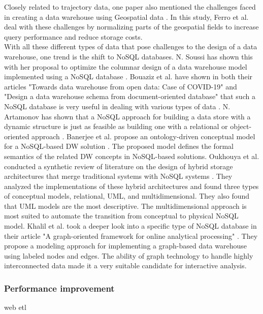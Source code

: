 \documentclass[11pt]{article}
\begin{document}
Closely related to trajectory data, one paper also mentioned the challenges faced in creating a data warehouse using Geospatial data \cite{Ferro2019221}. In this study, Ferro et al. deal with these challenges by normalizing parts of the geospatial fields to increase query performance and reduce storage costs.\\

With all these different types of data that pose challenges to the design of a data warehouse, one trend is the shift to NoSQL databases. N. Soussi has shown this with her proposal to optimize the columnar design of a data warehouse model implemented using a NoSQL database \cite{Soussi2023762}. Bouaziz et al. have shown in both their articles "Towards data warehouse from open data: Case of COVID-19" and "Design a data warehouse schema from document-oriented database" that such a NoSQL database is very useful in dealing with various types of data \cite{Bouaziz2019221, Bouaziz2021129}. N. Artamonov has shown that a NoSQL approach for building a data store with a dynamic structure is just as feasible as building one with a relational or object-oriented approach \cite{Artamonov2019794}. Banerjee et al. propose an ontology-driven conceptual model for a NoSQL-based DW solution \cite{Banerjee2021162}. The proposed model defines the formal semantics of the related DW concepts in NoSQL-based solutions. Oukhouya et al. conducted a synthetic review of literature on the design of hybrid storage architectures that merge traditional systems with NoSQL systems \cite{Oukhouya2023332}. They analyzed the implementations of these hybrid architectures and found three types of conceptual models, relational, UML, and multidimensional. They also found that UML models are the most descriptive. The multidimensional approach is most suited to automate the transition from conceptual to physical NoSQL model. Khalil et al. took a deeper look into a specific type of NoSQL database in their article "A graph-oriented framework for online analytical processing" \cite{Khalil2022547}. They propose a modeling approach for implementing a graph-based data warehouse using labeled nodes and edges. The ability of graph technology to handle highly interconnected data made it a very suitable candidate for interactive analysis. \\

\subsubsection{Performance improvement}
\label{performance}
web etl \cite{AbdAl-Rahman2023765}\\
\end{document}
